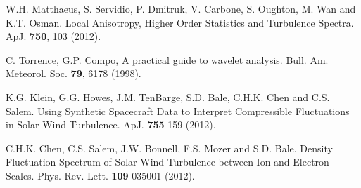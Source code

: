 \documentclass[aps,prl,amsmath,amssymb,reprint,superscriptaddress]{revtex4-1} %
\begin{document}
\begin{thebibliography}{99}
W.H. Matthaeus, S. Servidio, P. Dmitruk, V. Carbone, S. Oughton, M. Wan and K.T. Osman. Local Anisotropy, Higher Order Statistics and Turbulence Spectra. ApJ. {\bf 750}, 103 (2012).

C. Torrence, G.P. Compo, A practical guide to wavelet analysis. Bull. Am. Meteorol. Soc. {\bf 79}, 6178 (1998).

 K.G. Klein, G.G. Howes, J.M. TenBarge, S.D. Bale, C.H.K. Chen and C.S. Salem. Using Synthetic Spacecraft Data to Interpret Compressible Fluctuations in Solar Wind Turbulence. ApJ. {\bf 755} 159 (2012).

 C.H.K. Chen, C.S. Salem, J.W. Bonnell, F.S. Mozer and S.D. Bale. Density Fluctuation Spectrum of Solar Wind Turbulence between Ion and Electron Scales. Phys. Rev. Lett. {\bf 109} 035001 (2012).












\end{thebibliography}
\end{document}
